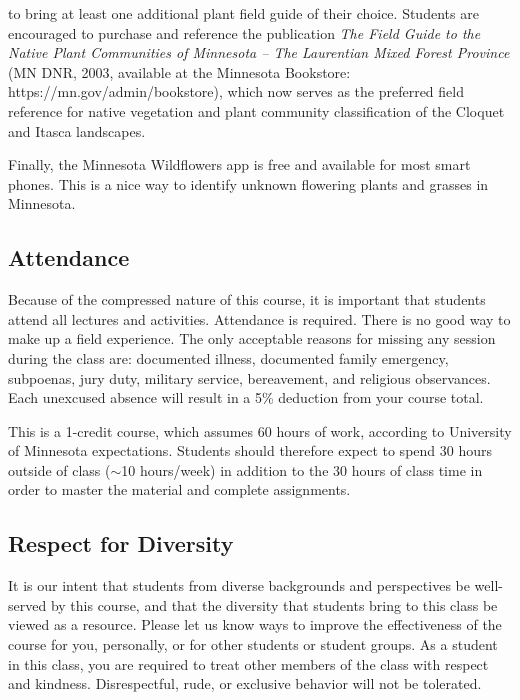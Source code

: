 \documentclass{tufte-handout}
\begin{document}
\begin{fullwidth}
 to bring at least one additional plant field guide of their choice. Students are encouraged to purchase and reference the publication \emph{The Field Guide to the Native Plant Communities of Minnesota – The Laurentian Mixed Forest Province} (MN DNR, 2003, available at the Minnesota Bookstore: https://mn.gov/admin/bookstore), which now serves as the preferred field reference for native vegetation and plant community classification of the Cloquet and Itasca landscapes. 

Finally, the Minnesota Wildflowers app is free and available for most smart phones. This is a nice way to identify unknown flowering plants and grasses in Minnesota. 

\subsection{Attendance}

Because of the compressed nature of this course, it is important that students attend all lectures and activities. Attendance is required. There is no good way to make up a field experience. The only acceptable reasons for missing any session during the class are: documented illness, documented family emergency, subpoenas, jury duty, military service, bereavement, and religious observances. Each unexcused absence will result in a 5\% deduction from your course total.

This is a 1-credit course, which assumes 60 hours of work, according to University of Minnesota expectations. Students should therefore expect to spend 30 hours outside of class ($\sim$10 hours/week) in addition to the 30 hours of class time in order to master the material and complete assignments.

\subsection{Respect for Diversity}

It is our intent that students from diverse backgrounds and perspectives be well-served by this course, and that the diversity that students bring to this class be viewed as a resource. Please let us know ways to improve the effectiveness of the course for you, personally, or for other students or student groups. As a student in this class, you are required to treat other members of the class with respect and kindness. Disrespectful, rude, or exclusive behavior will not be tolerated.


\end{fullwidth}
\end{document}
